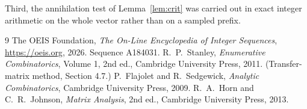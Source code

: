 \documentclass[11pt,a4paper]{article}
\theoremstyle{plain}
\theoremstyle{definition}
\begin{document}
Third, the annihilation test of Lemma~\ref{lem:crit} was carried out in exact integer
arithmetic on the whole vector rather than on a sampled prefix.

\begin{thebibliography}{9}
 The OEIS Foundation, \emph{The On-Line Encyclopedia of Integer
Sequences}, \url{https://oeis.org}, 2026. Sequence A184031.
 R.~P.~Stanley, \emph{Enumerative Combinatorics}, Volume 1, 2nd ed.,
Cambridge University Press, 2011. (Transfer-matrix method, Section 4.7.)
 P.~Flajolet and R.~Sedgewick, \emph{Analytic Combinatorics}, Cambridge
University Press, 2009.
 R.~A.~Horn and C.~R.~Johnson, \emph{Matrix Analysis}, 2nd ed., Cambridge
University Press, 2013.
\end{thebibliography}
\end{document}
